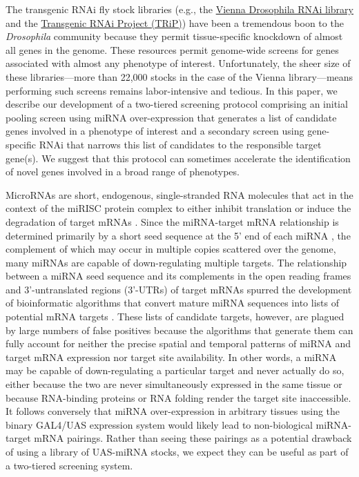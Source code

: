 The transgenic RNAi fly stock libraries (e.g., the \href{http://stockcenter.vdrc.at/control/rnailibrary}{Vienna Drosophila RNAi library} \cite{Oppel_Scheiblauer_et_al__2007} and the \href{http://www.flyrnai.org/TRiP-HOME.html}{Transgenic RNAi Project (TRiP)}) have been a tremendous boon to the \emph{Drosophila} community because they permit tissue-specific knockdown of almost all genes in the genome. These resources permit genome-wide screens for genes associated with almost any phenotype of interest. Unfortunately, the sheer size of these libraries---more than 22,000 stocks in the case of the Vienna library---means performing such screens remains labor-intensive and tedious. In this paper, we describe our development of a two-tiered screening protocol comprising an initial pooling screen using miRNA over-expression that generates a list of candidate genes involved in a phenotype of interest and a secondary screen using gene-specific RNAi that narrows this list of candidates to the responsible target gene(s). We suggest that this protocol can sometimes accelerate the identification of novel genes involved in a broad range of phenotypes.

MicroRNAs are short, endogenous, single-stranded RNA molecules that act in the context of the miRISC protein complex to either inhibit translation or induce the degradation of target mRNAs \cite{BARTEL_2004}. Since the miRNA-target mRNA relationship is determined primarily by a short seed sequence at the 5' end of each miRNA \cite{ones-Rhoades_Bartel_Burge_2003,Lai_2002}, the complement of which may occur in multiple copies scattered over the genome, many miRNAs are capable of down-regulating multiple targets. The relationship between a miRNA seed sequence and its complements in the open reading frames and 3'-untranslated regions (3'-UTRs) of target mRNAs spurred the development of bioinformatic algorithms that convert mature miRNA sequences into lists of potential mRNA targets \cite{Rajewsky_2006}. These lists of candidate targets, however, are plagued by large numbers of false positives because the algorithms that generate them can fully account for neither the precise spatial and temporal patterns of miRNA and target mRNA expression nor target site availability. In other words, a miRNA may be capable of down-regulating a particular target and never actually do so, either because the two are never simultaneously expressed in the same tissue or because RNA-binding proteins or RNA folding render the target site inaccessible. It follows conversely that miRNA over-expression in arbitrary tissues using the binary GAL4/UAS expression system would likely lead to non-biological miRNA-target mRNA pairings. Rather than seeing these pairings as a potential drawback of using a library of UAS-miRNA stocks, we expect they can be useful as part of a two-tiered screening system.

